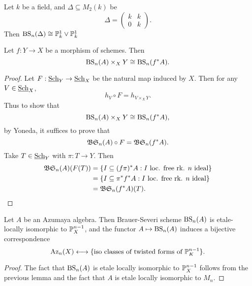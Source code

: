 \begin{ex}\label{bs-ex2}
Let $k$ be a field, and $\Delta\subseteq M_2(k)$ be
$$\Delta = \left(\begin{array}{cc}
k & k\\
0 & k
\end{array}\right).$$
Then $\textnormal{BS}_n(\Delta) \cong \mathbb{P}^1_k\vee\mathbb{P}^1_k$
\end{ex}

\begin{lem}\label{bs-pullback lemma}
Let $f: Y\rightarrow X$ be a morphism of schemes.  Then
$$\textnormal{BS}_n(A)\times_X Y\cong \textnormal{BS}_n(f^*A).$$
\end{lem}
\begin{proof}
Let $F: \textnormal{\underline{Sch}}_Y\rightarrow\textnormal{\underline{Sch}}_X$ be the natural map induced by $X$.  Then for any $V\in\textnormal{\underline{Sch}}_X$,
$$h_V\circ F = h_{V\times_XY}.$$
Thus to show that
$$\textnormal{BS}_n(A)\times_X Y\cong \textnormal{BS}_n(f^*A),$$
by Yoneda, it suffices to prove that
$$\mathfrak{BS}_n(A)\circ F = \mathfrak{BS}_n(f^*A).$$
Take $T\in\textnormal{\underline{Sch}}_Y$ with $\pi: T\rightarrow Y$.  Then
\begin{align*}
\mathfrak{BS}_n(A)(F(T)) & = \{I\subseteq (f\pi)^*A: I\ \text{loc. free rk. $n$ ideal}\}\\
                     & = \{I\subseteq \pi^*f^*A: I\ \text{loc. free rk. $n$ ideal}\}\\
                     & = \mathfrak{BS}_n(f^*A)(T).
\end{align*}
\end{proof}

\begin{prop}
Let $A$ be an Azumaya algebra.  Then Brauer-Severi scheme $\textnormal{BS}_n(A)$ is etale-locally isomorphic to $\mathbb{P}_X^{n-1}$, and the functor $A\mapsto \textnormal{BS}_n(A)$ induces a bijective correspondence
$$\textnormal{Az}_n(X)\longleftrightarrow \{\text{iso classes of twisted forms of $\mathbb{P}^{n-1}_K$}\}.$$
\end{prop}
\begin{proof}
The fact that $\textnormal{BS}_n(A)$ is etale locally isomorphic to $\mathbb{P}^{n-1}_X$ follows from the previous lemma and the fact that $A$ is etale locally isomorphic to $M_n$.
\end{proof}


